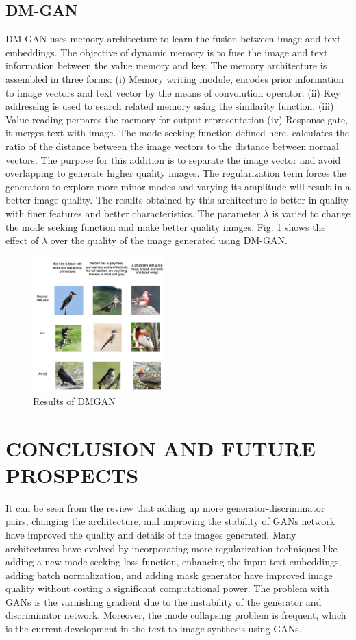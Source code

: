 \documentclass[conference]{IEEEtran}
\begin{document}
	\subsection{DM-GAN}
	DM-GAN uses memory architecture to learn the fusion between image and text embeddings. The objective of dynamic memory is to fuse the image and text information between the value memory and key. The memory architecture is assembled in three forms: (i) Memory writing module, encodes prior information to image vectors and text vector by the means of convolution operator. (ii) Key addressing is used to search related memory using the similarity function. (iii) Value reading perpares the memory for output representation (iv) Response gate, it merges text with image.
	The mode seeking function defined here, calculates the ratio of the distance between the image vectors to the distance between normal vectors. The purpose for this addition is to separate the image vector and avoid overlapping to generate higher quality images. The regularization term forces the generators to explore more minor modes and varying its amplitude will result in a better image quality. The results obtained by this architecture is better in quality  with finer features and better characteristics. The parameter $\lambda$ is varied to change the mode seeking function and make better quality images. Fig. \ref{gan_dm} shows the effect of $\lambda$ over the quality of the image generated using DM-GAN.
	
	\begin{figure}[htbp]
		\centering
		\includegraphics[width=0.45\textwidth]{DMGAN.png}
		\caption{Results of DMGAN \cite{b4}}
		\label{gan_dm}
	\end{figure}
	
	\section{CONCLUSION AND FUTURE PROSPECTS}
	It can be seen from the review that adding up more generator-discriminator pairs, changing the architecture, and improving the stability of GANs network have improved the quality and details of the images generated. Many architectures have evolved by incorporating more regularization techniques like adding a new mode seeking loss function, enhancing the input text embeddings, adding batch normalization, and adding mask generator have improved image quality without costing a significant computational power. The problem with GANs is the varnishing gradient due to the instability of the generator and discriminator network. Moreover, the mode collapsing problem is frequent, which is the current development in the text-to-image synthesis using GANs.
	
\end{document}
